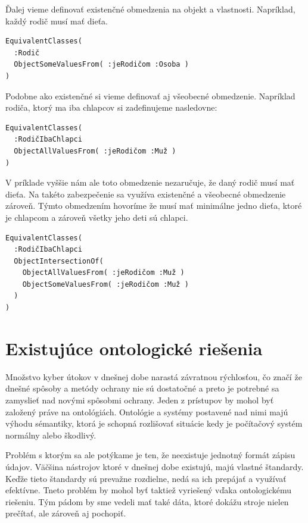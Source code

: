 \documentclass[12pt, a4paper, oneside]{book}
\begin{document}
Ďalej vieme definovať existenčné obmedzenia na objekt a vlastnosti. Napríklad, každý rodič musí mať dieťa.
\begin{verbatim}
EquivalentClasses(
  :Rodič 
  ObjectSomeValuesFrom( :jeRodičom :Osoba )
)
\end{verbatim}


Podobne ako existenčné si vieme definovať aj všeobecné obmedzenie. Napríklad rodiča, ktorý ma iba chlapcov si zadefinujeme nasledovne:
\begin{verbatim}
EquivalentClasses(
  :RodičIbaChlapci 
  ObjectAllValuesFrom( :jeRodičom :Muž )
)
\end{verbatim}


V príklade vyššie nám ale toto obmedzenie nezaručuje, že daný rodič musí mať dieťa. Na takéto zabezpečenie sa využíva existenčné a všeobecné obmedzenie zároveň. Týmto obmedzením hovoríme že musí mať minimálne jedno dieťa, ktoré je chlapcom a zároveň všetky jeho deti sú chlapci.
\begin{verbatim}
EquivalentClasses(
  :RodičIbaChlapci 
  ObjectIntersectionOf(
    ObjectAllValuesFrom( :jeRodičom :Muž )
    ObjectSomeValuesFrom( :jeRodičom :Muž )
  )
)
\end{verbatim}





\chapter{Existujúce ontologické riešenia}
Množstvo kyber útokov v dnešnej dobe narastá závratnou rýchlosťou, čo značí že dnešné spôsoby a metódy ochrany nie sú dostatočné a preto je potrebné sa zamyslieť nad novými spôsobmi ochrany. Jeden z prístupov by mohol byť založený práve na ontológiách. Ontológie a systémy postavené nad nimi majú výhodu sémantiky, ktorá je schopná rozlišovať situácie kedy je počítačový systém normálny alebo škodlivý.


Problém s ktorým sa ale potýkame je ten, že neexistuje jednotný formát zápisu údajov. Väčšina nástrojov ktoré v dnešnej dobe existujú, majú vlastné štandardy. Keďže tieto štandardy sú prevažne rozdielne, nedá sa ich prepájať a využívať efektívne. Tneto problém by mohol byť taktiež vyriešený vďaka ontologickému riešeniu. Tým pádom by sme vedeli mať také dáta, ktoré dokážu stroje nielen prečítať, ale zároveň aj pochopiť. 
 
\end{document}
